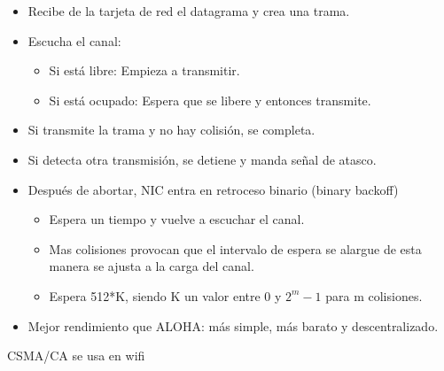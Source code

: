 \documentclass[12pt, twoside, openright]{report} %
\begin{document}
          \begin{itemize}
          \item
            Recibe de la tarjeta de red el datagrama y crea una trama.
          \item
            Escucha el canal:

            \begin{itemize}
              \item
              Si está libre: Empieza a transmitir.
            \item
              Si está ocupado: Espera que se libere y entonces
              transmite.
            \end{itemize}
          \item
            Si transmite la trama y no hay colisión, se completa.
          \item
            Si detecta otra transmisión, se detiene y manda señal de
            atasco.
          \item
            Después de abortar, NIC entra en retroceso binario (binary
            backoff)

            \begin{itemize}
              \item
              Espera un tiempo y vuelve a escuchar el canal.
            \item
              Mas colisiones provocan que el intervalo de espera se
              alargue de esta manera se ajusta a la carga del canal.
            \item
              Espera 512*K, siendo K un valor entre 0 y \(2^{m}-1\) para
              m colisiones.
            \end{itemize}
          \item
            Mejor rendimiento que ALOHA: más simple, más barato y
            descentralizado.
          \end{itemize}

          CSMA/CA se usa en wifi
\end{document}
